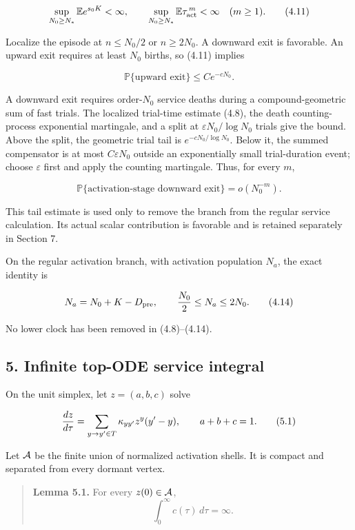 \[
 \sup_{N_0\ge N_*}\mathbb E e^{s_0K}<\infty,\qquad
 \sup_{N_0\ge N_*}\mathbb E\tau_{\rm act}^{\,m}<\infty
 \quad(m\ge1).                                         \tag{4.11}
\]

Localize the episode at \(n\le N_0/2\) or \(n\ge2N_0\). A downward exit
is favorable. An upward exit requires at least \(N_0\) births, so (4.11)
implies

\[
               \mathbb P\{\text{upward exit}\}\le Ce^{-cN_0}.           \tag{4.12}
\]

A downward exit requires order-\(N_0\) service deaths during a
compound-geometric sum of fast trials. The localized trial-time estimate
(4.8), the death counting-process exponential martingale, and a split at
\(\varepsilon N_0/\log N_0\) trials give the bound. Above the split, the
geometric trial tail is \(e^{-cN_0/\log N_0}\). Below it, the summed
compensator is at most \(C\varepsilon N_0\) outside an exponentially
small trial-duration event; choose \(\varepsilon\) first and apply the
counting martingale. Thus, for every \(m\),

\[
 \mathbb P\{\text{activation-stage downward exit}\}
 =o(N_0^{-m}).                                         \tag{4.13}
\]

This tail estimate is used only to remove the branch from the regular
service calculation. Its actual scalar contribution is favorable and is
retained separately in Section 7.

On the regular activation branch, with activation population \(N_a\),
the exact identity is

\[
                         N_a=N_0+K-D_{\rm pre},
 \qquad {N_0\over2}\le N_a\le2N_0.                    \tag{4.14}
\]

No lower clock has been removed in (4.8)--(4.14).

\subsection{5. Infinite top-ODE service
integral}

On the unit simplex, let \(z=(a,b,c)\) solve

\[
 {dz\over d\tau}
 =\sum_{y\to y'\in T}\kappa_{yy'}z^y(y'-y),
 \qquad a+b+c=1.                                      \tag{5.1}
\]

Let \({\cal A}\) be the finite union of normalized activation shells. It
is compact and separated from every dormant vertex.

\begin{quote}
\textbf{Lemma 5.1.} For every \(z(0)\in{\cal A}\), \[
                      \int_0^\infty c(\tau)\,d\tau=\infty.             \tag{5.2}
\]
\end{quote}

